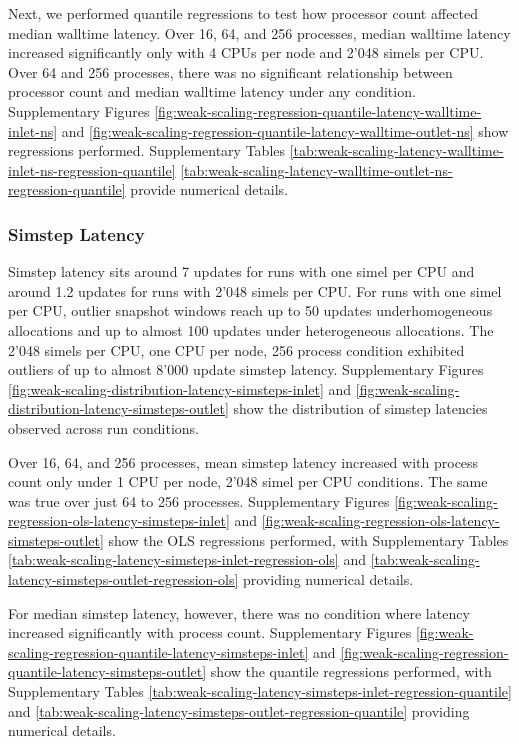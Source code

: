 Next, we performed quantile regressions to test how processor count affected median walltime latency.
Over 16, 64, and 256 processes, median walltime latency increased significantly only with 4 CPUs per node and 2'048 simels per CPU.
Over 64 and 256 processes, there was no significant relationship between processor count and median walltime latency under any condition.
Supplementary Figures \ref{fig:weak-scaling-regression-quantile-latency-walltime-inlet-ns} and \ref{fig:weak-scaling-regression-quantile-latency-walltime-outlet-ns} show regressions performed.
Supplementary Tables \ref{tab:weak-scaling-latency-walltime-inlet-ns-regression-quantile} \ref{tab:weak-scaling-latency-walltime-outlet-ns-regression-quantile} provide numerical details.

\subsubsection{Simstep Latency}

Simstep latency sits around 7 updates for runs with one simel per CPU and around 1.2 updates for runs with 2'048 simels per CPU.
For runs with one simel per CPU, outlier snapshot windows reach up to 50 updates underhomogeneous allocations and up to almost 100 updates under heterogeneous allocations.
The 2'048 simels per CPU, one CPU per node, 256 process condition exhibited outliers of up to almost 8'000 update simstep latency.
Supplementary Figures \ref{fig:weak-scaling-distribution-latency-simsteps-inlet} and \ref{fig:weak-scaling-distribution-latency-simsteps-outlet}  show the distribution of simstep latencies observed across run conditions.

Over 16, 64, and 256 processes, mean simstep latency increased with process count only under 1 CPU per node, 2'048 simel per CPU conditions.
The same was true over just 64 to 256 processes.
Supplementary Figures \ref{fig:weak-scaling-regression-ols-latency-simsteps-inlet} and \ref{fig:weak-scaling-regression-ols-latency-simsteps-outlet} show the OLS regressions performed, with
Supplementary Tables \ref{tab:weak-scaling-latency-simsteps-inlet-regression-ols} and \ref{tab:weak-scaling-latency-simsteps-outlet-regression-ols} providing numerical details.

For median simstep latency, however, there was no condition where latency increased significantly with process count.
Supplementary Figures \ref{fig:weak-scaling-regression-quantile-latency-simsteps-inlet} and \ref{fig:weak-scaling-regression-quantile-latency-simsteps-outlet} show the quantile regressions performed, with Supplementary Tables \ref{tab:weak-scaling-latency-simsteps-inlet-regression-quantile} and \ref{tab:weak-scaling-latency-simsteps-outlet-regression-quantile} providing numerical details.

